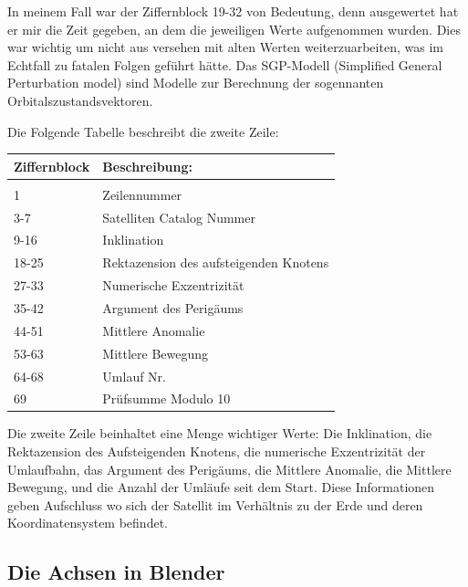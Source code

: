 \bigskip

In meinem Fall war der Ziffernblock 19-32 von Bedeutung, denn ausgewertet hat er mir die Zeit
gegeben, an dem die jeweiligen Werte aufgenommen wurden. Dies war wichtig um nicht aus versehen
mit alten Werten weiterzuarbeiten, was im Echtfall zu fatalen Folgen geführt hätte.
Das SGP-Modell (Simplified General Perturbation model) sind Modelle zur Berechnung der sogennanten Orbitalszustandsvektoren.

Die Folgende Tabelle beschreibt die zweite Zeile:

\bigskip
  
\begin{tabular}{l|l}
 Ziffernblock & Beschreibung: \\\hline
 & \\
 1 & Zeilennummer \\[0,1cm]
 3-7 & Satelliten Catalog Nummer \\[0,1cm]
 9-16 & Inklination \\[0,1cm]
 18-25 & Rektazension des aufsteigenden Knotens \\[0,1cm]
 27-33 & Numerische Exzentrizität \\[0,1cm]
 35-42 & Argument des Perigäums \\[0,1cm]
 44-51 & Mittlere Anomalie \\[0,1cm]
 53-63 & Mittlere Bewegung \\[0,1cm]
 64-68 & Umlauf Nr. \\[0,1cm]
 69 & Prüfsumme Modulo 10 \\[0,1cm]
\end{tabular}

\bigskip

Die zweite Zeile beinhaltet eine Menge wichtiger Werte:
Die Inklination, die Rektazension des Aufsteigenden Knotens, die numerische Exzentrizität der
Umlaufbahn, das Argument des Perigäums, die Mittlere Anomalie, die Mittlere Bewegung, und die
Anzahl der Umläufe seit dem Start.
Diese Informationen geben Aufschluss wo sich der Satellit im Verhältnis zu der Erde und deren Koordinatensystem befindet.
\par

\subsection{Die Achsen in Blender}

